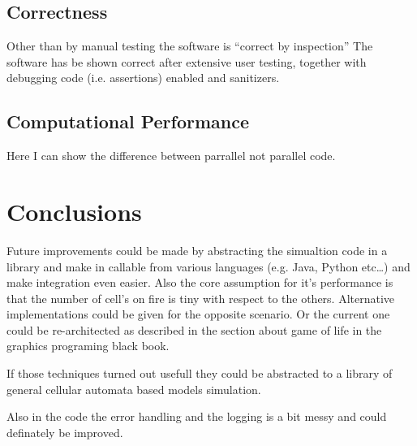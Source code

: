 \documentclass{article}
\begin{document}
\subsection{Correctness}\label{sec:correctness}

Other than by manual testing the software is ``correct by inspection''
The software has be shown correct after extensive user testing, together with
debugging code (i.e. assertions) enabled and sanitizers.

\subsection{Computational Performance}\label{sec:computational_performance}

Here I can show the difference between parrallel not parallel code.

\section{Conclusions}\label{sec:conclusions}

Future improvements could be made by abstracting the simualtion code in a
library and make in callable from various languages (e.g. Java, Python etc\dots)
and make integration even easier. Also the core assumption for it's performance
is that the number of cell's on fire is tiny with respect to the others.
Alternative implementations could be given for the opposite scenario. Or the
current one could be re-architected as described in the section about game of
life in the graphics programing black book.

If those techniques turned out usefull they could be abstracted to a library of
general cellular automata based models simulation.

Also in the code the error handling and the logging is a bit messy and could
definately be improved.



\end{document}
